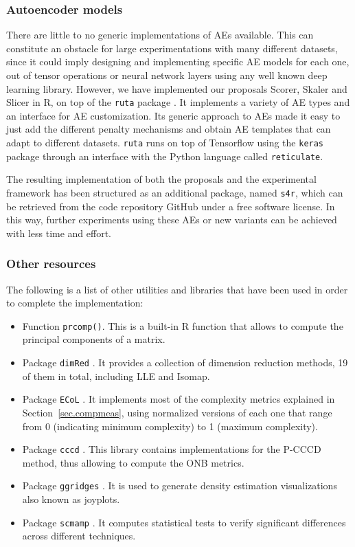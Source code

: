 \documentclass[
	fontsize=11pt, %
	twoside=false, %
	open=any, %
	secnumdepth=1, %
]{kaobook}
\begin{document}
  \subsubsection{Autoencoder models}

  There are little to no generic implementations of AEs available. This can constitute an obstacle for large experimentations with many different datasets, since it could imply designing and implementing specific AE models for each one, out of tensor operations or neural network layers using any well known deep learning library. However, we have implemented our proposals Scorer, Skaler and Slicer in R, on top of the \texttt{ruta} package \cite{charte2019ruta}. It implements a variety of AE types and an interface for AE customization. Its generic approach to AEs made it easy to just add the different penalty mechanisms and obtain AE templates that can adapt to different datasets. \texttt{ruta} runs on top of Tensorflow using the \texttt{keras} package through an interface with the Python language called \texttt{reticulate}.

  The resulting implementation of both the proposals and the experimental framework has been structured as an additional package, named \texttt{s4r}, which can be retrieved from the code repository GitHub under a free software license. In this way, further experiments using these AEs or new variants can be achieved with less time and effort.

  \subsubsection{Other resources}

  The following is a list of other utilities and libraries that have been used in order to complete the implementation:

  \begin{itemize}
    \item Function \texttt{prcomp()}. This is a built-in R function that allows to compute the principal components of a matrix.
    \item Package \texttt{dimRed} \cite{dimred}. It provides a collection of dimension reduction methods, 19 of them in total, including LLE and Isomap.
    \item Package \texttt{ECoL} \cite{lorena2019complex}. It implements most of the complexity metrics explained in Section~\ref{sec.compmeas}, using normalized versions of each one that range from 0 (indicating minimum complexity) to 1 (maximum complexity).
    \item Package \texttt{cccd} \cite{cccd}. This library contains implementations for the P-CCCD method, thus allowing to compute the ONB metrics.
    \item Package \texttt{ggridges} \cite{ggridges}. It is used to generate density estimation visualizations also known as joyplots.
    \item Package \texttt{scmamp} \cite{scmamp}. It computes statistical tests to verify significant differences across different techniques.
  \end{itemize}
\fi
\end{document}
